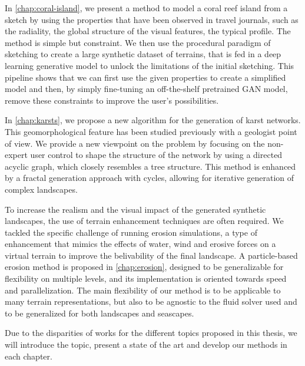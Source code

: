 In \cref{chap:coral-island}, we present a method to model a coral reef island from a sketch by using the properties that have been observed in travel journals, such as the radiality, the global structure of the visual features, the typical profile. The method is simple but constraint. We then use the procedural paradigm of sketching to create a large synthetic dataset of terrains, that is fed in a deep learning generative model to unlock the limitations of the initial sketching. This pipeline shows that we can first use the given properties to create a simplified model and then, by simply fine-tuning an off-the-shelf pretrained GAN model, remove these constraints to improve the user's possibilities.

In \cref{chap:karsts}, we propose a new algorithm for the generation of karst networks. This geomorphological feature has been studied previously with a geologist point of view. We provide a new viewpoint on the problem by focusing on the non-expert user control to shape the structure of the network by using a directed acyclic graph, which closely resembles a tree structure. This method is enhanced by a fractal generation approach with cycles, allowing for iterative generation of complex landscapes.

To increase the realism and the visual impact of the generated synthetic landscapes, the use of terrain enhancement techniques are often required. We tackled the specific challenge of running erosion simulations, a type of enhancement that mimics the effects of water, wind and erosive forces on a virtual terrain to improve the belivability of the final landscape. A particle-based erosion method is proposed in \cref{chap:erosion}, designed to be generalizable for flexibility on multiple levels, and its implementation is oriented towards speed and parallelization. The main flexibility of our method is to be applicable to many terrain representations, but also to be agnostic to the fluid solver used and to be generalized for both landscapes and seascapes.

Due to the disparities of works for the different topics proposed in this thesis, we will introduce the topic, present a state of the art and develop our methods in each chapter.





